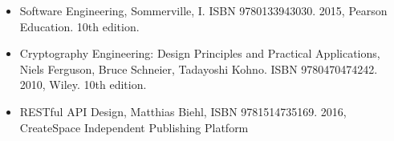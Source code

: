 \begin{itemize}
    \item Software Engineering, Sommerville, I. ISBN 9780133943030. 2015, Pearson Education. 10th edition.
    \item Cryptography Engineering: Design Principles and Practical Applications, Niels Ferguson, Bruce Schneier, Tadayoshi Kohno. ISBN 9780470474242. 2010, Wiley. 10th edition.
    \item RESTful API Design, Matthias Biehl, ISBN 9781514735169. 2016, CreateSpace Independent Publishing Platform
\end{itemize}
